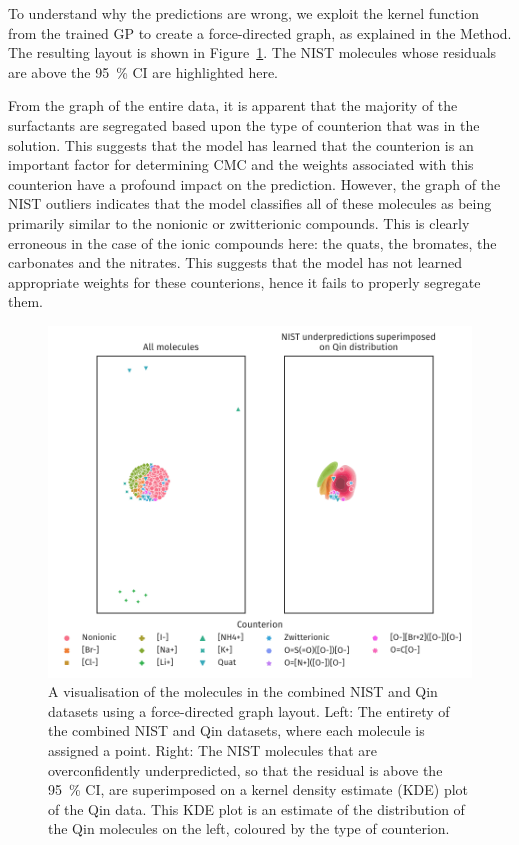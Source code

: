 To understand why the predictions are wrong, we exploit the kernel function from
the trained GP to create a force-directed graph, as explained in the Method. The
resulting layout is shown in Figure~\ref{fig:fdg}. The NIST molecules whose
residuals are above the \SI{95}{\%} CI are highlighted here.

From the graph of the entire data, it is apparent that the majority of the
surfactants are segregated based upon the type of counterion that was in the
solution. This suggests that the model has learned that the counterion is an
important factor for determining CMC and the weights associated with this
counterion have a profound impact on the prediction. However, the graph of the
NIST outliers indicates that the model classifies all of these molecules as
being primarily similar to the nonionic or zwitterionic compounds. This is
clearly erroneous in the case of the ionic compounds here: the quats, the
bromates, the carbonates and the nitrates. This suggests that the model has not
learned appropriate weights for these counterions, hence it fails to properly
segregate them.

\begin{figure}
    \includegraphics[width=\textwidth]{images/force-graph.pdf}
    \caption{A visualisation of the molecules in the combined NIST and Qin
        datasets using a force-directed graph layout. Left: The entirety of the
        combined NIST and Qin datasets, where each molecule is assigned a point.
        Right: The NIST molecules that are overconfidently underpredicted, so
        that the residual is above the \SI{95}{\%} CI, are superimposed on a
        kernel density estimate (KDE) plot of the Qin data. This KDE plot is an
        estimate of the distribution of the Qin molecules on the left, coloured
        by the type of counterion.}
    \label{fig:fdg}
\end{figure}